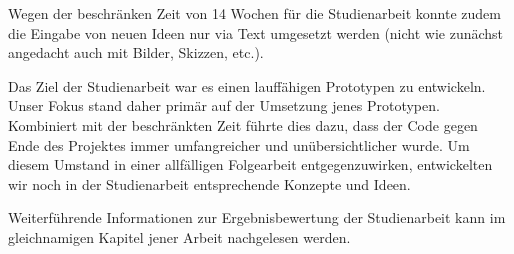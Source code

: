 Wegen der beschränken Zeit von 14 Wochen für die Studienarbeit konnte zudem die Eingabe von neuen Ideen nur via Text umgesetzt werden (nicht wie zunächst angedacht auch mit Bilder, Skizzen, etc.).

Das Ziel der Studienarbeit war es einen lauffähigen Prototypen zu entwickeln. Unser Fokus stand daher primär auf der Umsetzung jenes Prototypen. Kombiniert mit der beschränkten Zeit führte dies dazu, dass der Code gegen Ende des Projektes immer umfangreicher und unübersichtlicher wurde. Um diesem Umstand in einer allfälligen Folgearbeit entgegenzuwirken, entwickelten wir noch in der Studienarbeit entsprechende Konzepte und Ideen. 

Weiterführende Informationen zur Ergebnisbewertung der Studienarbeit kann im gleichnamigen Kapitel jener Arbeit \cite{methode635-sa} nachgelesen werden.


\newpage


\newpage


\newpage


\newpage


\newpage


\newpage


\newpage


\newpage


